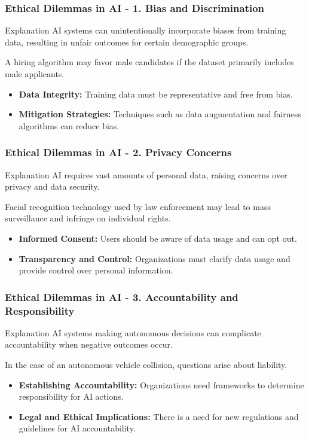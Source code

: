 \documentclass[aspectratio=169]{beamer}
\begin{document}
\begin{frame}[fragile]
    \frametitle{Ethical Dilemmas in AI - 1. Bias and Discrimination}
    \begin{block}{Explanation}
        AI systems can unintentionally incorporate biases from training data, resulting in unfair outcomes for certain demographic groups.
    \end{block}
    \begin{example}
        A hiring algorithm may favor male candidates if the dataset primarily includes male applicants.
    \end{example}
    \begin{itemize}
        \item \textbf{Data Integrity:} Training data must be representative and free from bias.
        \item \textbf{Mitigation Strategies:} Techniques such as data augmentation and fairness algorithms can reduce bias.
    \end{itemize}
\end{frame}

\begin{frame}[fragile]
    \frametitle{Ethical Dilemmas in AI - 2. Privacy Concerns}
    \begin{block}{Explanation}
        AI requires vast amounts of personal data, raising concerns over privacy and data security.
    \end{block}
    \begin{example}
        Facial recognition technology used by law enforcement may lead to mass surveillance and infringe on individual rights.
    \end{example}
    \begin{itemize}
        \item \textbf{Informed Consent:} Users should be aware of data usage and can opt out.
        \item \textbf{Transparency and Control:} Organizations must clarify data usage and provide control over personal information.
    \end{itemize}
\end{frame}

\begin{frame}[fragile]
    \frametitle{Ethical Dilemmas in AI - 3. Accountability and Responsibility}
    \begin{block}{Explanation}
        AI systems making autonomous decisions can complicate accountability when negative outcomes occur.
    \end{block}
    \begin{example}
        In the case of an autonomous vehicle collision, questions arise about liability.
    \end{example}
    \begin{itemize}
        \item \textbf{Establishing Accountability:} Organizations need frameworks to determine responsibility for AI actions.
        \item \textbf{Legal and Ethical Implications:} There is a need for new regulations and guidelines for AI accountability.
    \end{itemize}
\end{frame}
\end{document}
